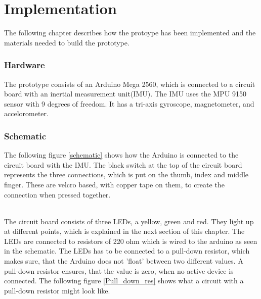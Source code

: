 \chapter{Implementation}

The following chapter describes how the protoype has been implemented and the materials needed to build the prototype. 

\subsection{Hardware}

The prototype consists of an Arduino Mega 2560\citep{Arduino}, which is connected to a circuit board with an inertial measurement unit(IMU). 
The IMU uses the MPU 9150 sensor with 9 degrees of freedom\citep{MPU}. It has a tri-axis gyroscope, magnetometer, and accelorometer.

\subsection{Schematic} 

The following figure \ref{schematic} shows how the Arduino is connected to the circuit board with the IMU. The black switch at the top of the circuit board
represents the three connections, which is put on the thumb, index and middle finger. These are velcro based, with copper tape on them, to create the connection when pressed together. 

\begin{minipage}{\linewidth}%
\label{schematic}
\end{minipage}\\

The circuit board consists of three LEDs, a yellow, green and red. They light up at different points, which is explained in the next section of this chapter.
The LEDs are connected to resistors of 220 ohm which is wired to the arduino as seen in the schematic. The LEDs has to be connected to a pull-down resistor\citep{Pull_down_res},
which makes sure, that the Arduino does not 'float' between two different values. A pull-down resistor ensures, that the value is zero, when no active device is connected.
The following figure \ref{Pull_down_res} shows what a circuit with a pull-down resistor might look like. 

